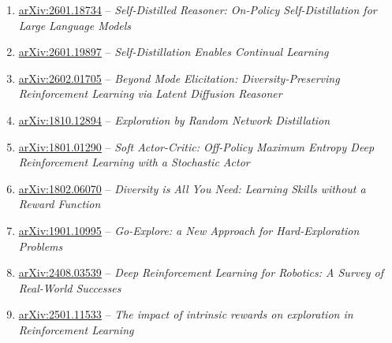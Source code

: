 \documentclass[11pt]{article}
\begin{document}
\begin{enumerate}
\item \href{https://arxiv.org/abs/2601.18734}{arXiv:2601.18734} -- \emph{Self-Distilled Reasoner: On-Policy Self-Distillation for Large Language Models}
\item \href{https://arxiv.org/abs/2601.19897}{arXiv:2601.19897} -- \emph{Self-Distillation Enables Continual Learning}
\item \href{https://arxiv.org/abs/2602.01705}{arXiv:2602.01705} -- \emph{Beyond Mode Elicitation: Diversity-Preserving Reinforcement Learning via Latent Diffusion Reasoner}
\item \href{https://arxiv.org/abs/1810.12894}{arXiv:1810.12894} -- \emph{Exploration by Random Network Distillation}
\item \href{https://arxiv.org/abs/1801.01290}{arXiv:1801.01290} -- \emph{Soft Actor-Critic: Off-Policy Maximum Entropy Deep Reinforcement Learning with a Stochastic Actor}
\item \href{https://arxiv.org/abs/1802.06070}{arXiv:1802.06070} -- \emph{Diversity is All You Need: Learning Skills without a Reward Function}
\item \href{https://arxiv.org/abs/1901.10995}{arXiv:1901.10995} -- \emph{Go-Explore: a New Approach for Hard-Exploration Problems}
\item \href{https://arxiv.org/abs/2408.03539}{arXiv:2408.03539} -- \emph{Deep Reinforcement Learning for Robotics: A Survey of Real-World Successes}
\item \href{https://arxiv.org/abs/2501.11533}{arXiv:2501.11533} -- \emph{The impact of intrinsic rewards on exploration in Reinforcement Learning}
\end{enumerate}
\end{document}
